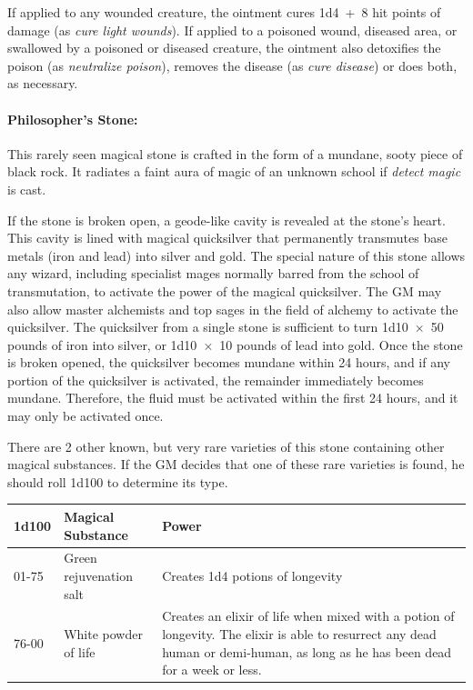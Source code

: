 \begin{multicols}{2}
If applied to any wounded creature, the ointment cures 1d4~+~8 hit points of damage (as \textit{cure light wounds}).  If applied to a poisoned wound, diseased area, or swallowed by a poisoned or diseased creature, the ointment also detoxifies the poison (as \textit{neutralize poison}), removes the disease (as \textit{cure disease}) or does both, as necessary.

\paragraph{Philosopher's Stone:} This rarely seen magical stone is crafted in the form of a mundane, sooty piece of black rock.  It radiates a faint aura of magic of an unknown school if \textit{detect magic} is cast.  

If the stone is broken open, a geode-like cavity is revealed at the stone's heart.  This cavity is lined with magical quicksilver that permanently transmutes base metals (iron and lead) into silver and gold.  The special nature of this stone allows any wizard, including specialist mages normally barred from the school of transmutation, to activate the power of the magical quicksilver.  The GM may also allow master alchemists and top sages in the field of alchemy to activate the quicksilver.  The quicksilver from a single stone is sufficient to turn 1d10~$\times$~50 pounds of iron into silver, or 1d10~$\times$~10 pounds of lead into gold.  Once the stone is broken opened, the quicksilver becomes mundane within 24 hours, and if any portion of the quicksilver is activated, the remainder immediately becomes mundane.  Therefore, the fluid must be activated within the first 24 hours, and it may only be activated once.

There are 2 other known, but very rare varieties of this stone containing other magical substances.  If the GM decides that one of these rare varieties is found, he should roll 1d100 to determine its type.

\noindent \begin{tabular}{|p{}|p{}|p{}|}
\hline
1d100	& Magical Substance	& Power \\
\hline\hline
\rowcolor[gray]{.9}01-75	& Green rejuvenation salt	& Creates 1d4 potions of longevity \\
76-00	& White powder of life	& Creates an elixir of life when mixed with a potion of longevity.  The elixir is able to resurrect any dead human or demi-human, as long as he has been dead for a week or less. \\
\hline
\end{tabular}


\end{multicols}
